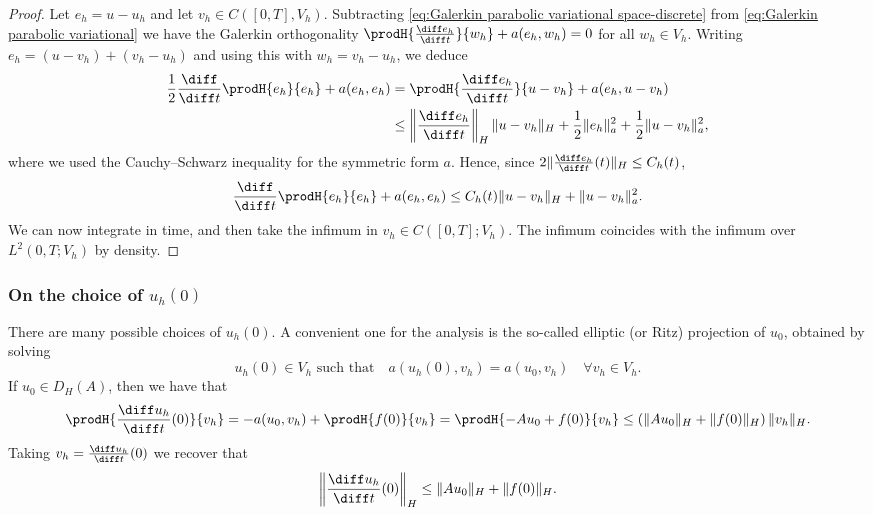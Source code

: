 \begin{proof}
    Let $e_h = u - u_h$ and let $v_h \in C([0,T] , V_h)$. Subtracting \eqref{eq:Galerkin parabolic variational space-discrete} from \eqref{eq:Galerkin parabolic variational} we have the Galerkin orthogonality $\prodH{\frac{\diff e_h}{\diff t}}{w_h} + a(e_h, w_h) = 0$ for all $w_h \in V_h$. Writing $e_h = (u - v_h) + (v_h - u_h)$ and using this with $w_h = v_h - u_h$, we deduce
    \begin{align*}
        \frac 1 2 \frac{\diff}{\diff t} \prodH{e_h}{e_h} + a(e_h, e_h)
         & = \prodH{\frac{\diff e_h}{\diff t}}{u - v_h} + a(e_h, u - v_h)                                                      \\
         & \le \left\| \frac{\diff e_h}{\diff t} \right\|_H \|u - v_h\|_H + \frac 1 2 \|e_h\|_a^2 + \frac 1 2 \|u - v_h\|_a^2,
    \end{align*}
    where we used the Cauchy--Schwarz inequality for the symmetric form $a$.
    Hence, since $2 \| \frac{\diff e_h}{\diff t}(t) \|_H \le C_h(t)$,
    \begin{equation*}
        \frac{\diff}{\diff t} \prodH{e_h}{e_h} + a(e_h, e_h) \le C_h(t) \|u - v_h\|_H + \|u - v_h\|_a^2.
    \end{equation*}
    We can now integrate in time, and then take the infimum in $v_h \in C([0,T]; V_h)$. The infimum coincides with the infimum over $L^2(0,T; V_h)$ by density.
\end{proof}

\subsubsection{On the choice of $u_{h}(0)$}

There are many possible choices of $u_h(0)$. A convenient one for the analysis is the so-called elliptic (or Ritz) projection of $u_0$, obtained by solving
\begin{equation*}
    u_h(0) \in V_h \text{ such that} \quad a(u_h(0), v_h) = a(u_0, v_h) \quad \forall v_h \in V_h.
\end{equation*}
If $u_0 \in D_H(A)$, then we have that
\begin{equation*}
    \prodH {\frac{\diff u_h}{\diff t}(0)}{v_h} = -a(u_0, v_h) + \prodH{f(0)}{v_h} = \prodH{-Au_0 + f(0)}{v_h} \le \left( \| Au_0 \|_H  + \|f(0) \|_H \right) \|v_h\|_H.
\end{equation*}
Taking $v_h = \frac{\diff u_h}{\diff t}(0)$ we recover that
\begin{equation}
    \label{eq:Galerkin parabolic estimate duhdt(0)}
    \left\| \frac{\diff u_h}{\diff t}(0) \right\|_H \le \| Au_0 \|_H + \|f(0)\|_H.
\end{equation}


